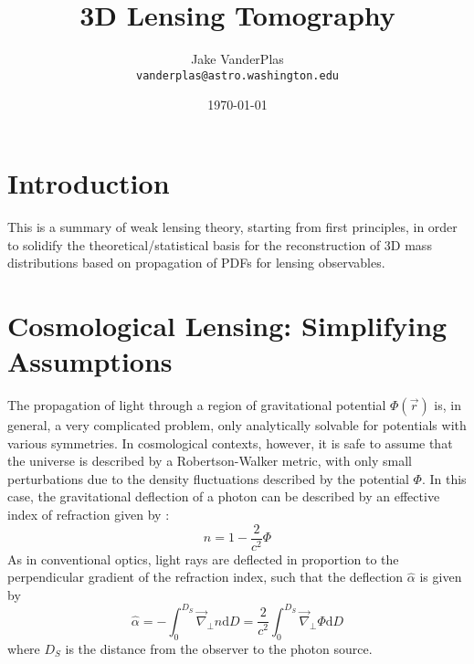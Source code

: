 \documentclass[12pt,preprint]{aastex}			%
\title{3D Lensing Tomography}	%
\author{Jake VanderPlas\\
  \texttt{vanderplas@astro.washington.edu}}
\date{\today}				%
\newcommand{\dd}{\mathrm{d}} %
\begin{document}



\section{Introduction}
This is a summary of weak lensing theory, starting from first principles, in 
order to solidify the theoretical/statistical basis for the reconstruction of
3D mass distributions based on propagation of PDFs for lensing observables.

\section{Cosmological Lensing: Simplifying Assumptions}
\label{simplifying_assumptions}
The propagation of light through a region of gravitational potential $\Phi(\vec{r})$ is, in general, a very complicated problem, only analytically solvable for potentials with various symmetries.  In cosmological contexts, however, it is safe to assume that the universe is described by a Robertson-Walker metric, with only small perturbations due to the density fluctuations described by the potential $\Phi$.  In this case, the gravitational deflection of a photon can be described by an effective index of refraction given by \citep[see][and references therein]{Narayan96}:
\begin{equation}
  n = 1-\frac{2}{c^2}\Phi 
\end{equation}
As in conventional optics, light rays are deflected in proportion to the perpendicular gradient of the refraction index, such that the deflection $\hat{\alpha}$ is given by
\begin{equation}
  \label{alpha-def}
  \hat{\alpha} = -\int_0^{D_S} \vec{\nabla}_\perp n \dd D = \frac{2}{c^2}\int_0^{D_S} \vec{\nabla}_\perp\Phi \dd D
\end{equation}
where $D_S$ is the distance from the observer to the photon source.  
\end{document}
